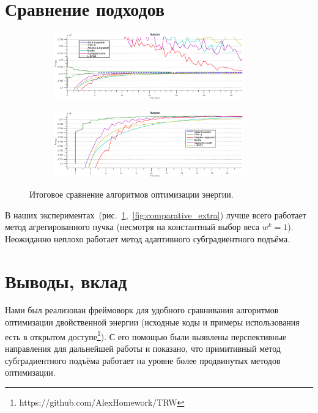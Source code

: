 \documentclass{article}
\begin{document}
\section{Сравнение подходов}
\begin{figure}
    \centering
    \begin{subfigure}[t]{\textwidth}
            \centering
            \includegraphics[width=0.9\textwidth]{comparative_small_tsukuba.eps}
    \end{subfigure}
    \begin{subfigure}[t]{\textwidth}
            \centering
            \includegraphics[width=0.9\textwidth]{comparative_tsukuba.eps}
    \end{subfigure}
    \caption{Итоговое сравнение алгоритмов оптимизации энергии.}
    \label{fig:comparative}
\end{figure}
В наших экспериментах~(рис.~\ref{fig:comparative},~\ref{fig:comparative_extra}) лучше всего работает метод агрегированного пучка (несмотря на константный выбор веса $w^k = 1$). Неожиданно неплохо работает метод адаптивного субградиентного подъёма.

\section{Выводы, вклад}
Нами был реализован фреймоворк для удобного сравнивания алгоритмов оптимизации двойственной энергии (исходные коды и примеры использования есть в открытом доступе\footnote{https://github.com/AlexHomework/TRW}). С его помощью были выявлены перспективные направления для дальнейшей работы и показано, что примитивный метод субградиентного подъёма работает на уровне более продвинутых методов оптимизации.
\end{document}
